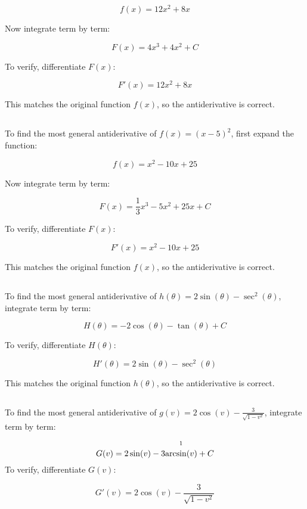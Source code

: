 \documentclass{article}
\begin{document}
\[
f(x) = 12x^2 + 8x
\]

Now integrate term by term:

\[
F(x) = 4x^3 + 4x^2 + C
\]

To verify, differentiate \( F(x) \):

\[
F'(x) = 12x^2 + 8x
\]

This matches the original function \( f(x) \), so the antiderivative is correct.
\subsection{}
To find the most general antiderivative of \( f(x) = (x - 5)^2 \), first expand the function:

\[
f(x) = x^2 - 10x + 25
\]

Now integrate term by term:

\[
F(x) = \frac{1}{3}x^3 - 5x^2 + 25x + C
\]

To verify, differentiate \( F(x) \):

\[
F'(x) = x^2 - 10x + 25
\]

This matches the original function \( f(x) \), so the antiderivative is correct.
\subsection{}
To find the most general antiderivative of \( h(\theta) = 2\sin(\theta) - \sec^2(\theta) \), integrate term by term:

\[
H(\theta) = -2\cos(\theta) - \tan(\theta) + C
\]

To verify, differentiate \( H(\theta) \):

\[
H'(\theta) = 2\sin(\theta) - \sec^2(\theta)
\]

This matches the original function \( h(\theta) \), so the antiderivative is correct.
\subsection{}
To find the most general antiderivative of \( g(v) = 2\cos(v) - \frac{3}{\sqrt{1 - v^2}} \), integrate term by term:

\[
G(v) = 2\sin(v) - 3\overset{\footnotemark }{\arcsin(v)} + C
\]
To verify, differentiate \( G(v) \):

\[
G'(v) = 2\cos(v) - \frac{3}{\sqrt{1 - v^2}}
\]
\end{document}
